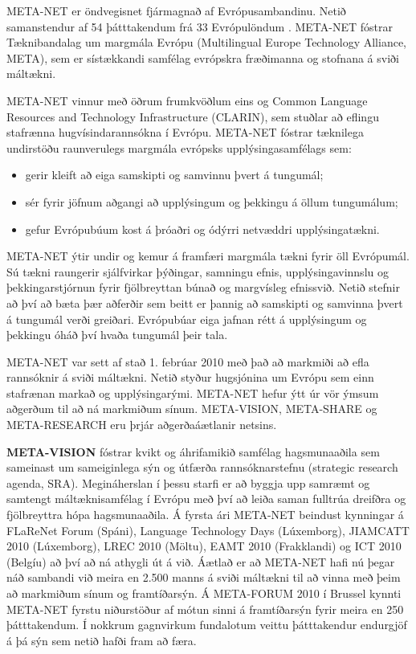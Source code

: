 \begin{multicols}{2}

META-NET er öndvegisnet fjármagnað af Evrópusambandinu. Netið samanstendur af 54 þátttakendum frá 33 Evrópulöndum \cite{rehm2011}. META-NET fóstrar Tæknibandalag um margmála Evrópu (Multilingual Europe Technology Alliance, META), sem er sístækkandi samfélag evrópskra fræðimanna og stofnana á sviði máltækni.

META-NET vinnur með öðrum frumkvöðlum eins og Common Language Resources and Technology Infrastructure (CLARIN), sem stuðlar að eflingu stafrænna hugvísindarannsókna í Evrópu. META-NET fóstrar tæknilega undirstöðu raunverulegs margmála evrópsks upplýsingasamfélags sem:

\begin{itemize}
\item gerir kleift að eiga samskipti og samvinnu þvert á tungumál;
\item sér fyrir jöfnum aðgangi að upplýsingum og þekkingu á öllum tungumálum;
\item gefur Evrópubúum kost á þróaðri og ódýrri netvæddri upplýsingatækni.
\end{itemize}

META-NET ýtir undir og kemur á framfæri margmála tækni fyrir öll Evrópumál. Sú tækni raungerir sjálfvirkar þýðingar, samningu efnis, upplýsingavinnslu og þekkingarstjórnun fyrir fjölbreyttan búnað og margvísleg efnissvið. Netið stefnir að því að bæta þær aðferðir sem beitt er þannig að samskipti og samvinna þvert á tungumál verði greiðari. Evrópubúar eiga jafnan rétt á upplýsingum og þekkingu óháð því hvaða tungumál þeir tala.

META-NET var sett af stað 1. febrúar 2010 með það að markmiði að efla rannsóknir á sviði máltækni. Netið styður hugsjónina um Evrópu sem einn stafrænan markað og upplýsingarými. META-NET hefur ýtt úr vör ýmsum aðgerðum til að ná markmiðum sínum. META-VISION, META-SHARE og META-RESEARCH eru þrjár aðgerðaáætlanir netsins.

\textbf{META-VISION} fóstrar kvikt og áhrifamikið samfélag hagsmunaaðila sem sameinast um sameiginlega sýn og útfærða rannsóknarstefnu (strategic research agenda, SRA). Megináherslan í þessu starfi er að byggja upp samræmt og samtengt máltæknisamfélag í Evrópu með því að leiða saman fulltrúa dreifðra og fjölbreyttra hópa hagsmunaaðila. Á fyrsta ári META-NET beindust kynningar á FLaReNet Forum (Spáni), Language Technology Days (Lúxemborg), JIAMCATT 2010 (Lúxemborg), LREC 2010 (Möltu), EAMT 2010 (Frakklandi) og ICT 2010 (Belgíu) að því að ná athygli út á við. Áætlað er að META-NET hafi nú þegar náð sambandi við meira en 2.500 manns á sviði máltækni til að vinna með þeim að markmiðum sínum og framtíðarsýn. Á META-FORUM 2010 í Brussel kynnti META-NET fyrstu niðurstöður af mótun sinni á framtíðarsýn fyrir meira en 250 þátttakendum. Í nokkrum gagnvirkum fundalotum veittu þátttakendur endurgjöf á þá sýn sem netið hafði fram að færa. 


\end{multicols}
